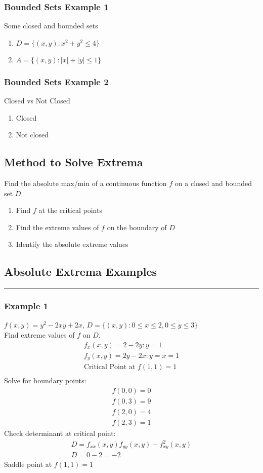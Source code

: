 \documentclass[12pt]{article}
\begin{document}
\subsubsection{Bounded Sets Example 1}
Some closed and bounded sets
\begin{enumerate}
	\item  \(D=\{(x,y): x^2 + y^2 \leq 4\}\) 
	\item \(A = \{(x,y): |x| + |y| \leq 1\}\) 
\end{enumerate}

\subsubsection{Bounded Sets Example 2}
Closed vs Not Closed
\begin{enumerate}
	\item Closed
	\item Not closed
\end{enumerate}

\subsection{Method to Solve Extrema}
Find the absolute max/min of a continuous function \(f\) on a closed and bounded set \(D\). 
\begin{enumerate}
	\item Find \(f\) at the critical points
	\item Find the extreme values of \(f\) on the boundary of \(D\) 
	\item Identify the absolute extreme values
\end{enumerate}

\subsection{Absolute Extrema Examples}
\rule{\textwidth}{0.1mm}

\subsubsection{Example 1}
\(f(x,y) = y^2 - 2xy + 2x\), \(D = \{(x,y): 0 \leq x \leq 2, 0 \leq y \leq 3\}\) \\
Find extreme values of \(f\) on \(D\). 
\begin{align}
	f_x(x,y) = 2- 2y: y = 1 \\
	f_y(x,y) = 2y - 2x: y = x = 1\\
	\nonumber \text{Critical Point at \(f(1,1) = 1\)} \\
\end{align}
Solve for boundary points:
\begin{align*}
	f(0,0) = 0 \\
	f(0,3) = 9 \\
	f(2,0) = 4 \\
	f(2,3) = 1
\end{align*}
Check determinant at critical point:
\begin{align*}
	D = f_{xx}(x,y)f_{yy}(x,y) - f_{xy}^2(x,y) \\
	D = 0 - 2 = -2
\end{align*}
Saddle point at \(f(1,1) = 1\)

\end{document}
